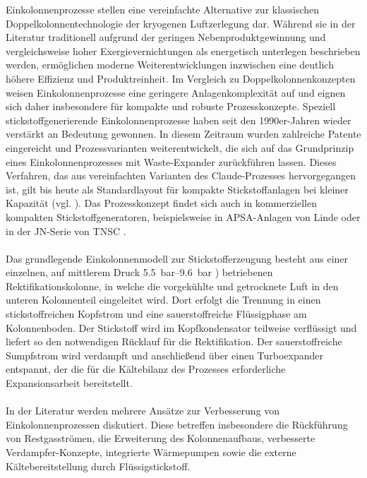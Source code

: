 Einkolonnenprozesse stellen eine vereinfachte Alternative zur klassischen Doppelkolonnentechnologie der kryogenen Luftzerlegung dar. Während sie in der Literatur traditionell aufgrund der geringen Nebenproduktgewinnung und vergleichsweise hoher Exergievernichtungen als energetisch unterlegen beschrieben werden, ermöglichen moderne Weiterentwicklungen inzwischen eine deutlich höhere Effizienz und Produktreinheit. Im Vergleich zu Doppelkolonnenkonzepten weisen Einkolonnenprozesse eine geringere Anlagenkomplexität auf und eignen sich daher insbesondere für kompakte und robuste Prozesskonzepte. Speziell stickstoffgenerierende Einkolonnenprozesse haben seit den 
1990er-Jahren wieder verstärkt an Bedeutung gewonnen. In diesem Zeitraum wurden zahlreiche Patente eingereicht und Prozessvarianten weiterentwickelt, die sich auf das Grundprinzip eines Einkolonnenprozesses mit Waste-Expander zurückführen lassen. Dieses Verfahren, das aus vereinfachten Varianten des Claude-Prozesses hervorgegangen ist, gilt bis heute als Standardlayout für kompakte Stickstoffanlagen bei kleiner Kapazität (vgl. \cite{hausenTieftemperaturtechnik1985, nickbockerUllmannsEncyclopediaIndustrial2000, heinz-wolfgangharingAirGasesNitrogen2007}). Das Prozesskonzept findet sich auch in kommerziellen kompakten Stickstoffgeneratoren, beispielsweise in APSA-Anlagen von Linde \cite{linde_handbook_2011} oder in der JN-Serie von TNSC \cite{masahiroHistoryAirSeparation}. \\
\\
Das grundlegende Einkolonnenmodell zur Stickstofferzeugung besteht aus einer einzelnen, auf mittlerem Druck \SIrange{5,5}{9,6}{\bar} \cite{agrawalProductionMediumPressure1991}) betriebenen 
Rektifikationskolonne, in welche die vorgekühlte und getrocknete Luft in den unteren Kolonnenteil eingeleitet wird. Dort erfolgt die Trennung in einen 
stickstoffreichen Kopfstrom und eine sauerstoffreiche Flüssigphase am 
Kolonnenboden. Der Stickstoff wird im Kopfkondensator teilweise verflüssigt und liefert so den notwendigen Rücklauf für die Rektifikation. Der 
sauerstoffreiche Sumpfstrom wird verdampft und anschließend 
über einen Turboexpander entspannt, der die für die Kältebilanz des Prozesses 
erforderliche Expansionsarbeit bereitstellt. \\
\\
In der Literatur werden mehrere Ansätze zur Verbesserung von Einkolonnenprozessen diskutiert. Diese betreffen insbesondere die Rückführung von Restgasströmen, die Erweiterung des Kolonnenaufbaus, verbesserte Verdampfer-Konzepte, integrierte Wärmepumpen sowie die externe Kältebereitstellung durch Flüssigstickstoff. \\
